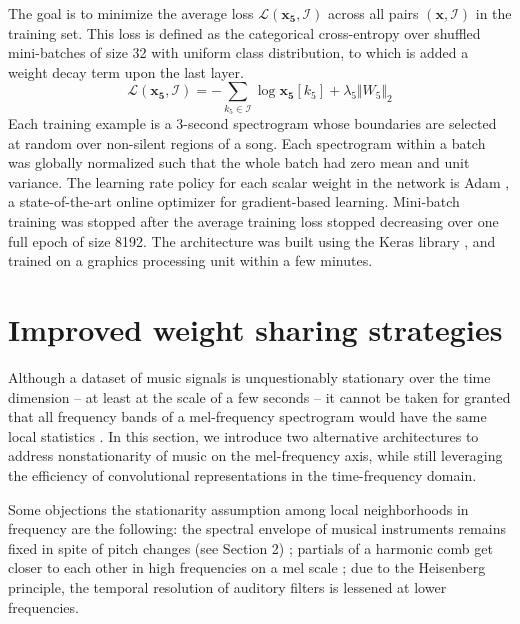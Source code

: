 \documentclass{article}
\begin{document}
The goal is to minimize the average loss $\mathscr{L}(\boldsymbol{x_5}, \mathcal{I})$
across all pairs $(\boldsymbol{x}, \mathcal{I})$ in the training set. This loss is defined as
the categorical cross-entropy over shuffled mini-batches of size 32 with uniform
class distribution, to which is added a weight decay term upon the last layer.
\begin{equation}
\mathscr{L}(\boldsymbol{x_5}, \mathcal{I}) =
- \sum_{k_5 \in \mathcal{I}} \log \boldsymbol{x_5}[k_5]
+ \lambda_5 \Vert W_5 \Vert_2
\end{equation}
Each training example is a 3-second spectrogram whose boundaries are selected at random
over non-silent regions of a song.
Each spectrogram within a batch was globally normalized
such that the whole batch had zero mean and unit variance.
The learning rate policy for each scalar weight in the network is Adam \cite{Kingma2015},
a state-of-the-art online optimizer for gradient-based learning.
Mini-batch training was stopped after the average training loss stopped
decreasing over one full epoch of size 8192.
The architecture was built using the Keras library \cite{Chollet2015},
and trained on a graphics processing unit within a few minutes.

\section{Improved weight sharing strategies}
Although a dataset of music signals is unquestionably stationary over the time
dimension -- at least at the scale of a few seconds -- it cannot be taken for granted
that all frequency bands of a mel-frequency spectrogram would have the same
local statistics \cite{Humphrey2013}.
In this section, we introduce two alternative architectures to address
nonstationarity of music on the mel-frequency axis,
while still leveraging the efficiency of convolutional representations in the
time-frequency domain.
 
Some objections the stationarity assumption among local neighborhoods in frequency
are the following:
the spectral envelope of musical instruments remains fixed in spite of
pitch changes (see Section 2) ;
partials of a harmonic comb get closer to each other in high frequencies on a mel scale ;
due to the Heisenberg principle, the temporal resolution of auditory filters is lessened at
lower frequencies.
\end{document}
